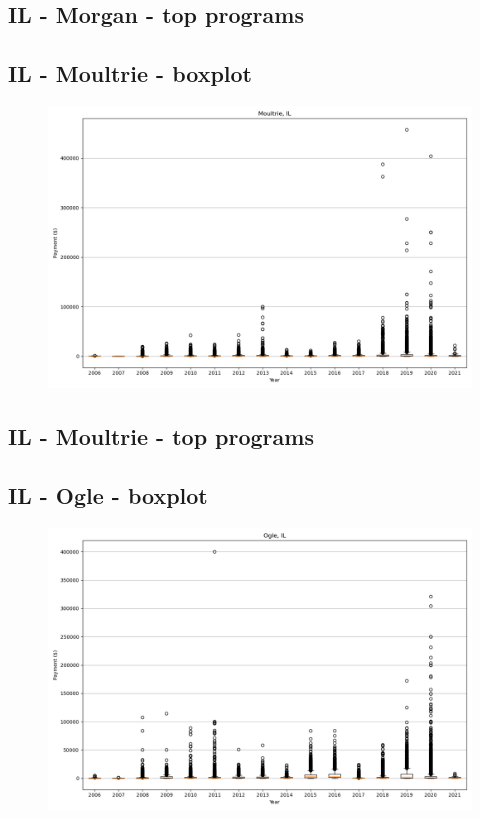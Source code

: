 \subsection*{IL - Morgan - top programs}

\newpage
\subsection*{IL - Moultrie - boxplot}
\begin{figure}[h]
\centering
\includegraphics[width=7in]{../output/boxplots/counties/Moultrie-IL_boxplot.png}
\end{figure}


\subsection*{IL - Moultrie - top programs}

\newpage
\subsection*{IL - Ogle - boxplot}
\begin{figure}[h]
\centering
\includegraphics[width=7in]{../output/boxplots/counties/Ogle-IL_boxplot.png}
\end{figure}


